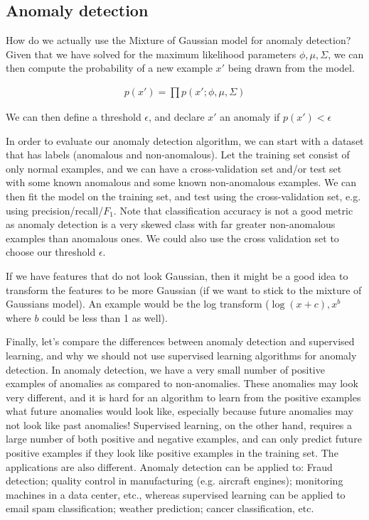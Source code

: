 \documentclass[letterpaper,10pt]{article}
\begin{document}
\subsection{Anomaly detection}

How do we actually use the Mixture of Gaussian model for anomaly detection? Given that we have solved for the maximum likelihood parameters $\phi, \mu, \Sigma$, we can then compute the probability of a new example $x'$ being drawn from the model.

\begin{align}
p(x') = \prod p(x' ; \phi, \mu, \Sigma )
\end{align}

We can then define a threshold $\epsilon$, and declare $x'$ an anomaly if $p(x') < \epsilon$

In order to evaluate our anomaly detection algorithm, we can start with a dataset that has labels (anomalous and non-anomalous). Let the training set consist of only normal examples, and we can have a cross-validation set and/or test set with some known anomalous and some known non-anomalous examples. We can then fit the model on the training set, and test using the cross-validation set, e.g. using precision/recall/$F_1$. Note that classification accuracy is not a good metric as anomaly detection is a very skewed class with far greater non-anomalous examples than anomalous ones. We could also use the cross validation set to choose our threshold $\epsilon$.

If we have features that do not look Gaussian, then it might be a good idea to transform the features to be more Gaussian (if we want to stick to the mixture of Gaussians model). An example would be the log transform ($\log (x+c), x^b$ where $b$ could be less than 1 as well).

Finally, let's compare the differences between anomaly detection and supervised learning, and why we should not use supervised learning algorithms for anomaly detection. In anomaly detection, we have a very small number of positive examples of anomalies as compared to non-anomalies. These anomalies may look very different, and it is hard for an algorithm to learn from the positive examples what future anomalies would look like, especially because future anomalies may not look like past anomalies! Supervised learning, on the other hand, requires a large number of both positive and negative examples, and can only predict future positive examples if they look like positive examples in the training set. The applications are also different. Anomaly detection can be applied to: Fraud detection; quality control in manufacturing (e.g. aircraft engines); monitoring machines in a data center, etc., whereas supervised learning can be applied to email spam classification; weather prediction; cancer classification, etc.
\end{document}
